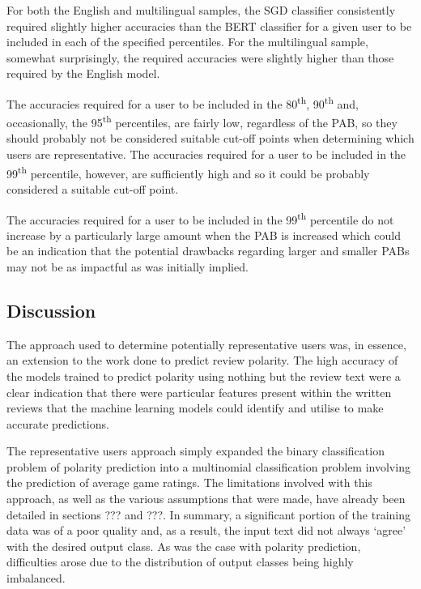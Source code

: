 For both the English and multilingual samples, the SGD classifier consistently required slightly higher accuracies than the BERT classifier for a given user to be included in each of the specified percentiles. For the multilingual sample, somewhat surprisingly, the required accuracies were slightly higher than those required by the English model.

The accuracies required for a user to be included in the 80\textsuperscript{th}, 90\textsuperscript{th} and, occasionally, the 95\textsuperscript{th} percentiles, are fairly low, regardless of the PAB, so they should probably not be considered suitable cut-off points when determining which users are representative. The accuracies required for a user to be included in the 99\textsuperscript{th} percentile, however, are sufficiently high and so it could be probably considered a suitable cut-off point.

The accuracies required for a user to be included in the 99\textsuperscript{th} percentile do not increase by a particularly large amount when the PAB is increased which could be an indication that the potential drawbacks regarding larger and smaller PABs may not be as impactful as was initially implied.

\subsection{Discussion}

The approach used to determine potentially representative users was, in essence, an extension to the work done to predict review polarity. The high accuracy of the models trained to predict polarity using nothing but the review text were a clear indication that there were particular features present within the written reviews that the machine learning models could identify and utilise to make accurate predictions.

The representative users approach simply expanded the binary classification problem of polarity prediction into a multinomial  classification problem involving the prediction of average game ratings. The limitations involved with this approach, as well as the various assumptions that were made, have already been detailed in sections ??? and ???. In summary, a significant portion of the training data was of a poor quality and, as a result, the input text did not always `agree' with the desired output class. As was the case with polarity prediction, difficulties arose due to the distribution of output classes being highly imbalanced.


